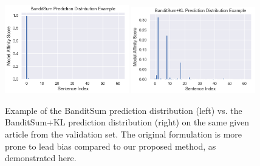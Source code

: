 \begin{figure}[h]
    \centering
    \includegraphics[width=0.48\textwidth]{fig/banditsum_pred_dist.png}
    \includegraphics[width=0.48\textwidth]{fig/mixed_rouge_pred_dist.png}
    \caption[Example of the BanditSum vs. BanditSum+KL prediction distributions.]{Example of the BanditSum prediction distribution (left) vs. the BanditSum+KL prediction distribution (right) on the same given article from the validation set. The original formulation is more prone to lead bias compared to our proposed method, as demonstrated here.}
    \label{fig:pred_dist}
\end{figure}